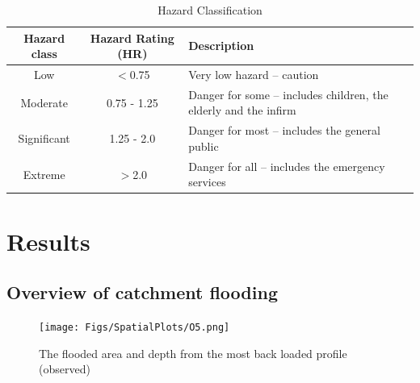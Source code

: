 \documentclass[APA,Times2COL]{WileyNJDv5}
\begin{document}
\begingroup
\setlength{\tabcolsep}{10pt} %
\renewcommand{\arraystretch}{1.5} %
\begin{table}[h!]
\centering
\caption{Hazard Classification }
\begin{tabular}{c c p{10cm}} 
 \hline
 \textbf{Hazard class} & \textbf{Hazard Rating (HR)} & \textbf{Description} \\ [0.5ex] 
 \hline
 Low & $<$0.75 & Very low hazard – caution \\
 Moderate & 0.75 - 1.25 & Danger for some – includes children, the elderly and the infirm\\
 Significant & 1.25 - 2.0 & Danger for most – includes the general public \\
 Extreme & $>$2.0 & Danger for all – includes the emergency services \\
 \hline
\end{tabular}
\label{table:hazard_cats}
\end{table}
\endgroup

\section{Results}\label{sec:results}

\subsection{Overview of catchment flooding}\label{subsec:overview}

\begin{figure}[!t]
    \centering
 \texttt{[image: Figs/SpatialPlots/O5.png]}   
   \caption{The flooded area and depth from the most back loaded profile (observed)}\label{fig:flooded_area_spatial_BL} 
\end{figure}
\end{document}

